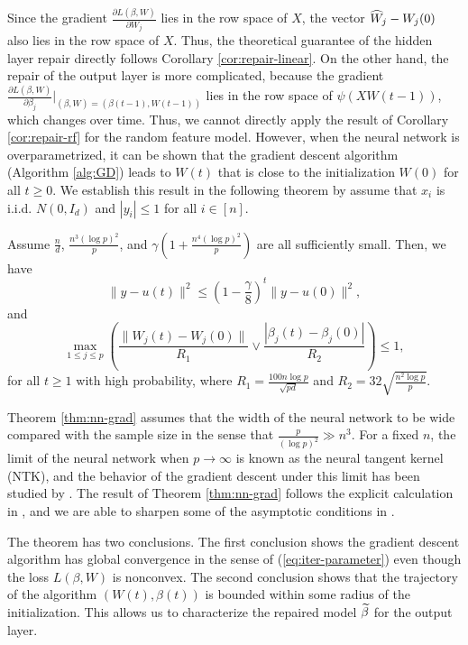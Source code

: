 Since the gradient $\frac{\partial L(\beta,W)}{\partial W_j}$ lies in the row space of $X$, the vector $\widehat{W}_j-W_j(0)$ also lies in the row space of $X$. Thus, the theoretical guarantee of the hidden layer repair directly follows Corollary \ref{cor:repair-linear}. On the other hand, the repair of the output layer is more complicated, because the gradient $\frac{\partial L(\beta,W)}{\partial \beta_j}|_{(\beta,W)=(\beta(t-1),W(t-1))}$ lies in the row space of $\psi(XW(t-1))$, which changes over time. Thus, we cannot directly apply the result of Corollary \ref{cor:repair-rf} for the random feature model. However, when the neural network is overparametrized, it can be shown that the gradient descent algorithm (Algorithm \ref{alg:GD}) leads to $W(t)$ that is close to the initialization $W(0)$ for all $t\geq 0$. We establish this result in the following theorem by assume that $x_i$ is i.i.d. $N(0,I_d)$ and $|y_i|\leq 1$ for all $i\in[n]$.
\begin{thm}\label{thm:nn-grad}
Assume $\frac{n}{d}$, $\frac{n^3(\log p)^2}{p}$, and $\gamma\left(1+\frac{n^4(\log p)^2}{p}\right)$ are all sufficiently small. Then, we have
\begin{equation}
\|y-u(t)\|^2 \leq \left(1-\frac{\gamma}{8}\right)^t\|y-u(0)\|^2, \label{eq:iter-function}
\end{equation}
and
\begin{equation}
\max_{1\leq j\leq p}\left(\frac{\|W_j(t)-W_j(0)\|}{R_1}\vee\frac{|\beta_j(t)-\beta_j(0)|}{R_2}\right) \leq 1, \label{eq:iter-parameter}
\end{equation}
for all $t\geq 1$ with high probability, where $R_1=\frac{100n\log p}{\sqrt{pd}}$ and $R_2=32\sqrt{\frac{n^2\log p}{p}}$.
\end{thm}
Theorem \ref{thm:nn-grad} assumes that the width of the neural network to be wide compared with the sample size in the sense that $\frac{p}{(\log p)^2}\gg n^3$. For a fixed $n$, the limit of the neural network when $p\rightarrow\infty$ is known as the neural tangent kernel (NTK), and the behavior of the gradient descent under this limit has been studied by \cite{jacot2018neural}. The result of Theorem \ref{thm:nn-grad} follows the explicit calculation in \cite{du2018gradient}, and we are able to sharpen some of the asymptotic conditions in \cite{du2018gradient}.

The theorem has two conclusions. The first conclusion shows the gradient descent algorithm has global convergence in the sense of (\ref{eq:iter-parameter}) even though the loss $L(\beta,W)$ is nonconvex. The second conclusion shows that the trajectory of the algorithm $(W(t),\beta(t))$ is bounded within some radius of the initialization. This allows us to characterize the repaired model $\widetilde{\beta}$ for the output layer.


